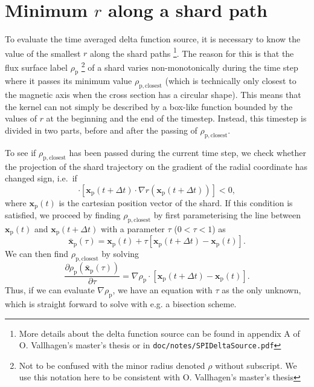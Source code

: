 \documentclass{notes}
\begin{document}
\section{Minimum $r$ along a shard path}
To evaluate the time averaged delta function source, it is necessary to know the value of the smallest $r$ along the shard paths \footnote{More details about the delta function source can be found in appendix A of O. Vallhagen's master's thesis or in \texttt{doc/notes/SPIDeltaSource.pdf}}. The reason for this is that the flux surface label $\rho _\mathrm{p}$ \footnote{Not to be confused with the minor radius denoted $\rho$ without subscript. We use this notation here to be consistent with O. Vallhagen's master's thesis} of a shard varies non-monotonically during the time step where it passes its minimum value $\rho _\mathrm{p,closest}$ (which is technically only closest to the magnetic axis when the cross section has a circular shape). This means that the kernel can not simply be described by a box-like function bounded by the values of $r$ at the beginning and the end of the timestep. Instead, this timestep is divided in two parts, before and after the passing of $\rho _\mathrm{p,closest}$.

To see if $\rho _\mathrm{p,closest}$ has been passed during the current time step, we check whether the projection of the shard trajectory on the gradient of the radial coordinate has changed sign, i.e.~if
\begin{equation}
	[\mathbf{x}_\mathrm{p}(t)\cdot \nabla r(\mathbf{x}_\mathrm{p}(t))] \cdot [\mathbf{x}_\mathrm{p}(t+\Delta t)\cdot \nabla r(\mathbf{x}_\mathrm{p}(t+\Delta t))]<0,
\end{equation}
where $\mathbf{x}_\mathrm{p}(t)$ is the cartesian position vector of the shard. If this condition is satisfied, we proceed by finding $\rho _\mathrm{p,closest}$ by first parameterising the line between $\mathbf{x}_\mathrm{p}(t)$ and $\mathbf{x}_\mathrm{p}(t+\Delta t)$ with a parameter $\tau$ ($0<\tau<1$) as
\begin{equation}
	\bar{\mathbf{x}}_\mathrm{p}(\tau) = \mathbf{x}_\mathrm{p}(t) + \tau [\mathbf{x}_\mathrm{p}(t+\Delta t) - \mathbf{x}_\mathrm{p}(t)].
\end{equation} 
We can then find $\rho _\mathrm{p,closest}$ by solving
\begin{equation}
	\frac{\partial \rho _\mathrm{p}(\bar{\mathbf{x}}_\mathrm{p}(\tau))}{\partial \tau} = \nabla \rho _\mathrm{p} \cdot [\mathbf{x}_\mathrm{p}(t+\Delta t) - \mathbf{x}_\mathrm{p}(t)].
\end{equation}
Thus, if we can evaluate $\nabla \rho _\mathrm{p}$, we have an equation with $\tau$ as the only unknown, which is straight forward to solve with e.g. a bisection scheme. 
\end{document}
